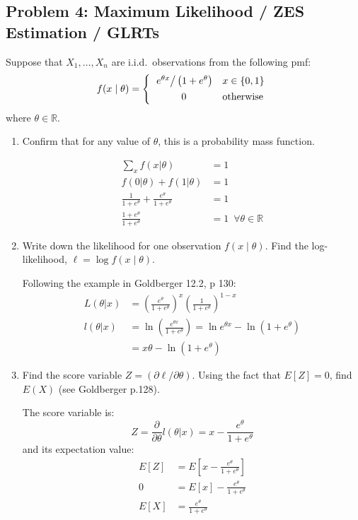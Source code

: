 \documentclass{article}
\newcommand{\field}[1]{\mathbb{#1}}
\newcommand{\1}{\mathbf{1}}
\newcommand{\R}{\field{R}} %
\begin{document}
\newpage
\subsection*{Problem 4: Maximum Likelihood / ZES Estimation / GLRTs}
Suppose that $X_1,\ldots ,X_n$ are i.i.d.~observations from the following pmf:
$$ f(x \mid \theta)  = \left\{\begin{array}{cl}
        \left. e^{\theta x}\right/\left(1+e^{\theta}\right) & x \in \{0,1\} \\[4pt]
        0 & \hbox{otherwise}
        \end{array}
        \right.
$$
where $\theta \in \mathbb{R}$.
\begin{enumerate}
    \item Confirm that for any value of $\theta$, this is a probability mass function.
    
    \begin{align*}
        \sum_x f(x|\theta) &= 1 \\
        f(0|\theta) + f(1|\theta) &= 1\\
        \frac{1}{1+e^\theta}  + \frac{e^\theta}{1+e^\theta} &= 1 \\
        \frac{1+e^\theta}{1+e^\theta} &= 1 \,\,\, \forall \theta \in \R
    \end{align*}
    
    \item Write down the likelihood for one observation $f(x \mid \theta)$. Find the log-likelihood, $\ell = \log f(x \mid \theta)$.
    
    Following the example in Goldberger 12.2, p 130:
    \begin{align*}
        L(\theta |x) &= \left(\frac{e^\theta}{1+e^\theta}\right)^x \left(\frac{1}{1+e^\theta}\right)^{1-x} \\
        l(\theta|x) &= \ln{\left( \frac{e^{\theta x}}{1+e^\theta}   \right)} = \ln{e^{\theta x}} - \ln{(1+e^\theta)} \\
        &= x\theta - \ln{(1+e^\theta)}
    \end{align*}
    
    \item Find the score variable $Z = ({\partial\ell / \partial \theta})$. Using the fact that $E[Z]=0$, find $E(X)$ (see Goldberger p.128). 
    
    The score variable is:
    $$Z = \frac{\partial}{\partial\theta} l(\theta | x) = x - \frac{e^\theta}{1+e^\theta} $$
    and its expectation value:
    \begin{align*}
        E[Z] &= E\left[ x - \frac{e^\theta}{1+e^\theta} \right] \\
        0 &= E[x] - \frac{e^\theta}{1+e^\theta} \\
        E[X] &= \frac{e^\theta}{1+e^\theta}
    \end{align*}
    

\end{enumerate}
\end{document}
